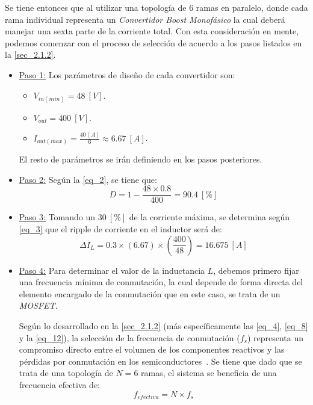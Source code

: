 \documentclass[12pt,a4paper]{article}
\begin{document}
Se tiene entonces que al utilizar una topología de 6 ramas en paralelo, donde cada rama individual representa un \textit{Convertidor Boost Monofásico} la cual deberá manejar una sexta parte de la corriente total. Con esta consideración en mente, podemos comenzar con el proceso de selección de acuerdo a los pasos listados en la \autoref{sec_2.1.2}.
\begin{itemize}
    \item \underline{Paso 1:} Los parámetros de diseño de cada convertidor son:
    \begin{itemize}
        \item $V_{in(min)} = 48 \ [V]$.
        \item $V_{out} = 400 \ [V]$.
        \item $I_{out(max)} = \frac{40 \ [A]}{6} \approx 6.67 \ [A]$.
    \end{itemize}
    El resto de parámetros se irán definiendo en los pasos posteriores.


    \item \underline{Paso 2:} Según la \autoref{eq_2}, se tiene que:
    \begin{equation}
        D = 1 - \frac{48 \times 0.8}{400} = 90.4 \ [\%]
        \label{eq_13}
    \end{equation}


    \item \underline{Paso 3:} Tomando un $30 \ [\%]$ de la corriente máxima, se determina según \autoref{eq_3} que el ripple de corriente en el inductor será de:
    \begin{equation}
        \Delta I_{L} = 0.3 \times (6.67) \times \left(\frac{400}{48}\right) = 16.675 \ [A]
        \label{eq_14}
    \end{equation}


    \item \underline{Paso 4:} Para determinar el valor de la inductancia $L$, debemos primero fijar una frecuencia mínima de conmutación, la cual depende de forma directa del elemento encargado de la conmutación que en este caso, se trata de un \textit{MOSFET}.

    Según lo desarrollado en la \autoref{sec_2.1.2} (más específicamente las \autoref{eq_4}, \autoref{eq_8} y la \autoref{eq_12}), la selección de la frecuencia de conmutación ($f_{s}$) representa un compromiso directo entre el volumen de los componentes reactivos y las pérdidas por conmutación en los semiconductores~\cite[Cap. 4, Sec. 3]{b8}. Se tiene que dado que se trata de una topología de $N = 6$ ramas, el sistema se beneficia de una frecuencia efectiva de:
    \begin{equation}
        f_{efectiva} = N \times f_{s}
        \label{eq_15}
    \end{equation}


\end{itemize}
\end{document}
